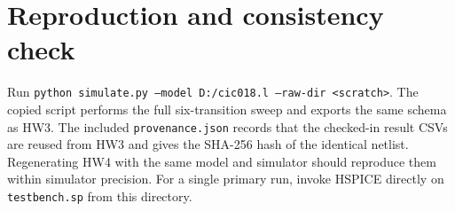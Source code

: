 \documentclass[11pt]{article}
\begin{document}
\section*{Reproduction and consistency check}
Run \texttt{python simulate.py --model D:/cic018.l --raw-dir <scratch>}. The copied script performs the full six-transition sweep and exports the same schema as HW3. The included \texttt{provenance.json} records that the checked-in result CSVs are reused from HW3 and gives the SHA-256 hash of the identical netlist. Regenerating HW4 with the same model and simulator should reproduce them within simulator precision. For a single primary run, invoke HSPICE directly on \texttt{testbench.sp} from this directory.
\end{document}
